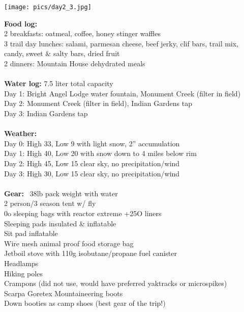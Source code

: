 \documentclass[10pt,a4paper]{article}
\newenvironment{Figure}
  {\par\medskip\noindent\minipage{\linewidth}}
  {\endminipage\par\medskip}
\begin{document}
\begin{multicols}{2}
\begin{Figure}
 \centering
 \texttt{[image: pics/day2\_3.jpg]}
\end{Figure}

\textbf{Food log: }\\
2 breakfasts: oatmeal, coffee, honey stinger waffles\\
	3 trail day lunches: salami, parmesan cheese, beef jerky, clif bars, trail mix, candy, sweet \& salty bars, dried fruit\\
	2 dinners: Mountain House dehydrated meals
\\
\\
\textbf{Water log:} 7.5 liter total capacity\\
	Day 1: Bright Angel Lodge water fountain, Monument Creek (filter in field)\\
	Day 2: Monument Creek (filter in field), Indian Gardens tap\\
	Day 3: Indian Gardens tap
\\
\\
\textbf{Weather:}\\
	Day 0: High 33, Low 9 with light snow, 2” accumulation\\
	Day 1: High 40, Low 20 with snow down to 4 miles below rim\\
	Day 2: High 45, Low 15 clear sky, no precipitation/wind\\
	Day 3: High 30, Low 15 clear sky, no precipitation/wind
\\
\\
\textbf{Gear:} ~38lb pack weight with water\\
	2 person/3 season tent w/ fly \\
0o sleeping bags with reactor extreme +25O liners\\
	Sleeping pads insulated \& inflatable\\
	Sit pad inflatable \\
Wire mesh animal proof food storage bag\\
	Jetboil stove with 110g isobutane/propane fuel canister\\
	Headlamps \\
Hiking poles\\
	Crampons (did not use, would have preferred yaktracks or microspikes)\\
	Scarpa Goretex Mountaineering boots\\
	Down booties as camp shoes (best gear of the trip!)\\

\end{multicols}
\end{document}
